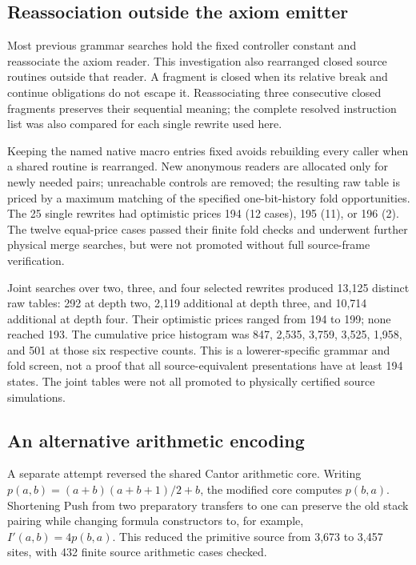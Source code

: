 \documentclass[11pt,letterpaper]{article}
\begin{document}
\subsection{Reassociation outside the axiom emitter}

Most previous grammar searches hold the fixed controller constant and
reassociate the axiom reader. This investigation also rearranged closed
source routines outside that reader. A fragment is closed when its
relative break and continue obligations do not escape it. Reassociating
three consecutive closed fragments preserves their sequential meaning;
the complete resolved instruction list was also compared for each
single rewrite used here.

Keeping the named native macro entries fixed avoids rebuilding every
caller when a shared routine is rearranged. New anonymous readers are
allocated only for newly needed pairs; unreachable controls are removed;
the resulting raw table is priced by a maximum matching of the specified
one-bit-history fold opportunities. The 25 single rewrites had optimistic
prices 194 (12 cases), 195 (11), or 196 (2). The twelve equal-price cases
passed their finite fold checks and underwent further physical merge
searches, but were not promoted without full source-frame verification.

Joint searches over two, three, and four selected rewrites produced
13,125 distinct raw tables: 292 at depth two, 2,119 additional at depth
three, and 10,714 additional at depth four. Their optimistic prices ranged
from 194 to 199; none reached 193. The cumulative price histogram was
847, 2,535, 3,759, 3,525, 1,958, and 501 at those six respective counts.
This is a lowerer-specific grammar and fold screen, not a proof that all
source-equivalent presentations have at least 194 states. The joint
tables were not all promoted to physically certified source simulations.

\subsection{An alternative arithmetic encoding}

A separate attempt reversed the shared Cantor arithmetic core. Writing
$p(a,b)=(a+b)(a+b+1)/2+b$, the modified core computes $p(b,a)$.
Shortening Push from two preparatory transfers to one can preserve the
old stack pairing while changing formula constructors to, for example,
$I'(a,b)=4p(b,a)$. This reduced the primitive source from 3,673 to 3,457
sites, with 432 finite source arithmetic cases checked.
\end{document}
